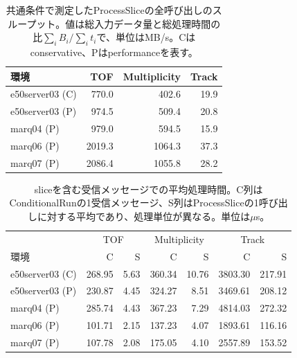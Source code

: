\begin{table}[htbp]
  \centering
  \small
  \caption{共通条件で測定したProcessSliceの全呼び出しのスループット。値は総入力データ量と総処理時間の比$\sum_i B_i/\sum_i t_i$で、単位はMB/s。Cはconservative、Pはperformanceを表す。}
  \label{tab:common-hlf-slice}
  \begin{tabular}{lrrr}
    \hline
    環境 & TOF & Multiplicity & Track \\
    \hline
    e50server03 (C) & 770.0 & 402.6 & 19.9 \\
    e50server03 (P) & 974.5 & 509.4 & 20.8 \\
    marq04 (P) & 979.0 & 594.5 & 15.9 \\
    marq06 (P) & 2019.3 & 1064.3 & 37.3 \\
    marq07 (P) & 2086.4 & 1055.8 & 28.2 \\
    \hline
  \end{tabular}
\end{table}

\begin{table}[htbp]
  \centering
  \small
  \caption{sliceを含む受信メッセージでの平均処理時間。C列はConditionalRunの1受信メッセージ、S列はProcessSliceの1呼び出しに対する平均であり、処理単位が異なる。単位は$\mu$s。}
  \label{tab:common-hlf-time}
  \begin{tabular}{lrrrrrr}
    \hline
    & \multicolumn{2}{c}{TOF} & \multicolumn{2}{c}{Multiplicity} & \multicolumn{2}{c}{Track} \\
    環境 & C & S & C & S & C & S \\
    \hline
    e50server03 (C) & 268.95 & 5.63 & 360.34 & 10.76 & 3803.30 & 217.91 \\
    e50server03 (P) & 230.87 & 4.45 & 324.27 & 8.51 & 3469.61 & 208.12 \\
    marq04 (P) & 285.74 & 4.43 & 367.23 & 7.29 & 4814.03 & 272.32 \\
    marq06 (P) & 101.71 & 2.15 & 137.23 & 4.07 & 1893.61 & 116.16 \\
    marq07 (P) & 107.78 & 2.08 & 175.05 & 4.10 & 2557.89 & 153.52 \\
    \hline
  \end{tabular}
\end{table}

